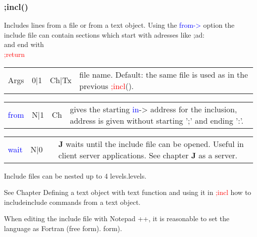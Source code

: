 \subsubsection{;incl()}
\label{incl}
 Includes lines from a file or from a text object. Using the \textcolor{blue}{from->}
option the include file can contain sections which start with adresses like
 ;ad: \\
and end with \\
\textcolor{Red}{;return}
\begin{table}[H]
\begin{tabular}{ m{}  m{}m{}p{}}
 Args & 0|1 & Ch|Tx &  file name. Default: the same file is used as in the previous \textcolor{Red}{;incl}().
\\ \cline{1-4}
\end{tabular}
\end{table}
\vspace{-1.51em}
\begin{table}[H]
\begin{tabular}{ m{}  m{}m{}p{}}
\textcolor{blue}{from} & N|1 & Ch &gives the starting \textcolor{blue}{in}-> address for the inclusion, address is given without starting ';'
 and ending ':'.
\\ \cline{1-4}
\end{tabular}
\end{table}
\vspace{-1.51em}
\begin{table}[H]
\begin{tabular}{ m{}  m{}m{}p{}}
\textcolor{blue}{wait}& N|0 & & \textbf{J} waits until the include file can be opened. Useful in client server applications.
 See chapter \textbf{J} as a server.
\\ \cline{1-4}
\end{tabular}
\end{table}
\begin{note}
Include files can be nested up to 4 levels.levels.
\end{note}
\begin{note}
See Chapter Defining a text object with text function and using it in \textcolor{Red}{;incl} how to includeinclude
 commands from a text object.
\end{note}
\begin{note}
When editing the include file with Notepad ++, it is reasonable to set the language as Fortran (free form). form).
\end{note}
